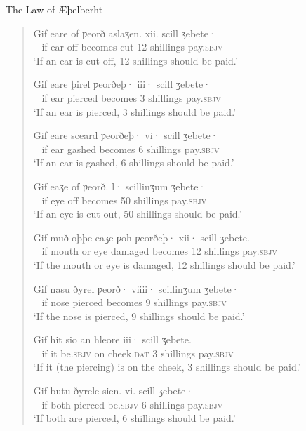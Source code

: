 \begin{texts}{The Law of Æþelberht}
\begin{quote}
     Gif eare of ƿeorð aslaʒen. xii. scill ʒebete·\\
    ~ if ear off becomes cut 12 shillings pay.\textsc{sbjv}\\\newline
    \trans `If an ear is cut off, 12 shillings should be paid.'
    
     Gif eare þirel ƿeorðeþ· iii· scill ʒebete·\\
    ~ if ear pierced becomes 3 shillings pay.\textsc{sbjv}\\\newline
    \trans `If an ear is pierced, 3 shillings should be paid.'
    
     Gif eare sceard ƿeorðeþ· vi· scill ʒebete·\\
    ~ if ear gashed becomes 6 shillings pay.\textsc{sbjv}\\\newline
    \trans `If an ear is gashed, 6 shillings should be paid.'
    
     Gif eaʒe of ƿeorð. l· scillinʒum ʒebete·\\
    ~ if eye off becomes 50 shillings pay.\textsc{sbjv}\\\newline
    \trans `If an eye is cut out, 50 shillings should be paid.'
    
     Gif muð oþþe eaʒe ƿoh ƿeorðeþ· xii· scill ʒebete.\\
    ~ if mouth or eye damaged becomes 12 shillings pay.\textsc{sbjv}\\\newline
    \trans `If the mouth or eye is damaged, 12 shillings should be paid.'
    
     Gif nasu ðyrel ƿeorð· viiii· scillinʒum ʒebete·\\
    ~ if nose pierced becomes 9 shillings pay.\textsc{sbjv}\\\newline
    \trans `If the nose is pierced, 9 shillings should be paid.'
    
     Gif hit sio an hleore iii· scill ʒebete.\\
    ~ if it be.\textsc{sbjv} on cheek.\textsc{dat} 3 shillings pay.\textsc{sbjv}\\\newline
    \trans `If it (the piercing) is on the cheek, 3 shillings should be paid.'
    
     Gif butu ðyrele sien. vi. scill ʒebete·\\
    ~ if both pierced be.\textsc{sbjv} 6 shillings pay.\textsc{sbjv}\\\newline
    \trans `If both are pierced, 6 shillings should be paid.'
    

\end{quote}
\end{texts}
